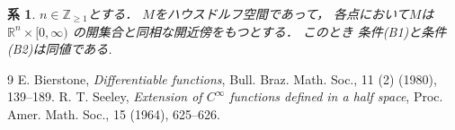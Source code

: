 \documentclass[leqno, a4paper, 12pt]{jsarticle}
\newtheorem{cor}[thm]{系}
\newcommand{\zz}{\mathbb{Z}}
\newcommand{\rr}{\mathbb{R}}
\begin{document}
\begin{cor}
$n\in \zz_{\ge 1}$とする．
$M$をハウスドルフ空間であって，
各点において$M$は$\rr^{n}\times [0, \infty)$
の開集合と同相な開近傍をもつとする．
このとき
条件(B1)と条件(B2)は同値である.
\end{cor}


	
\begin{thebibliography}{9}
E. Bierstone, 
\textit{Differentiable functions}, 
Bull. Braz. Math. Soc., 11 (2) (1980), 139--189.  
R. T. Seeley, 
\textit{
Extension of $C^{\infty}$ functions defined in a half space}, 
 Proc. Amer. Math. Soc., 15 (1964), 625--626. 


\end{thebibliography}
\end{document}
